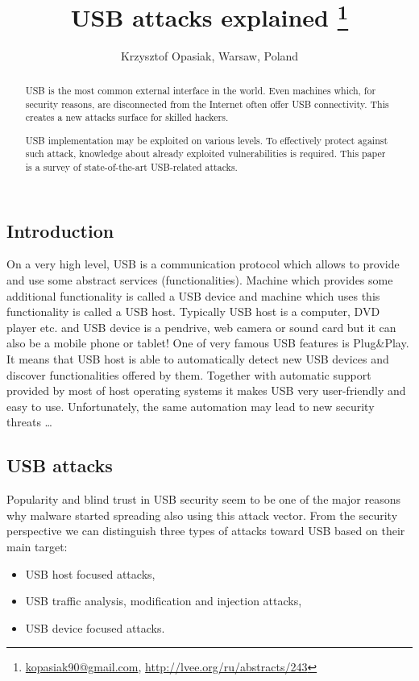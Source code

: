 \documentclass[10pt, a5paper]{article}
\begin{document}
\title{USB attacks explained \footnote{\url{kopasiak90@gmail.com}, \url{http://lvee.org/ru/abstracts/243}}}
\author{Krzysztof Opasiak, Warsaw, Poland}
\maketitle
\begin{abstract}
USB is the most common external interface in the world. Even machines which, for security reasons, are disconnected from the Internet often offer USB connectivity. This creates a new attacks surface for skilled hackers.

USB implementation may be exploited on various levels. To effectively protect against such attack, knowledge about already exploited vulnerabilities is required. This paper is a survey of state-of-the-art USB-related attacks.

\end{abstract}
\subsection*{Introduction}
On a very high level, USB is a communication protocol which allows to provide and use some abstract services (functionalities). Machine which provides some additional functionality is called a USB device and machine which uses this functionality is called a USB host. Typically USB host is a computer, DVD player etc. and USB device is a pendrive, web camera or sound card but it can also be a mobile phone or tablet!
One of very famous USB features is Plug\&Play. It means that USB host is able to automatically detect new USB devices and discover functionalities offered by them. Together with automatic support \linebreak provided by most of host operating systems it makes USB very user-friendly and easy to use. Unfortunately, the same automation may lead to new security threats \ldots{}
\subsection*{USB attacks}
Popularity and blind trust in USB security seem to be one of the major reasons why malware started spreading also using this attack vector. From the security perspective we can distinguish three types of attacks toward USB based on their main target:
\begin{itemize}
 \item USB host focused attacks,
 \item USB traffic analysis, modification and injection attacks,
 \item USB device focused attacks.
\end{itemize}
\end{document}
